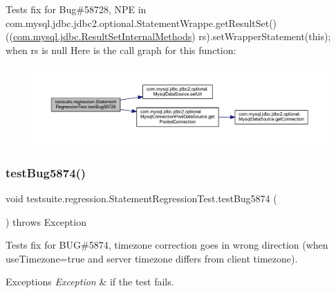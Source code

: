 Tests fix for Bug\#58728, N\+PE in com.\+mysql.\+jdbc.\+jdbc2.\+optional.\+Statement\+Wrappe.\+get\+Result\+Set() ((\mbox{\hyperlink{interfacecom_1_1mysql_1_1jdbc_1_1_result_set_internal_methods}{com.\+mysql.\+jdbc.\+Result\+Set\+Internal\+Methods}}) rs).set\+Wrapper\+Statement(this); when rs is null Here is the call graph for this function\+:
\nopagebreak
\begin{figure}[H]
\begin{center}
\leavevmode
\includegraphics[width=350pt]{classtestsuite_1_1regression_1_1_statement_regression_test_a84dc5a1748d9651df8f09ae7b8e2fd2b_cgraph}
\end{center}
\end{figure}
\mbox{\label{classtestsuite_1_1regression_1_1_statement_regression_test_add450cdadfb025367a53db78024a96e6}} 
\subsubsection{\texorpdfstring{test\+Bug5874()}{testBug5874()}}
{\footnotesize\ttfamily void testsuite.\+regression.\+Statement\+Regression\+Test.\+test\+Bug5874 (\begin{DoxyParamCaption}{ }\end{DoxyParamCaption}) throws Exception}

Tests fix for B\+UG\#5874, timezone correction goes in wrong \textquotesingle{}direction\textquotesingle{} (when use\+Timezone=true and server timezone differs from client timezone).


\begin{DoxyExceptions}{Exceptions}
{\em Exception} & if the test fails. \\
\hline
\end{DoxyExceptions}
\mbox{\label{classtestsuite_1_1regression_1_1_statement_regression_test_af54f8dc05c901b420749b5525d6b1db9}} 

